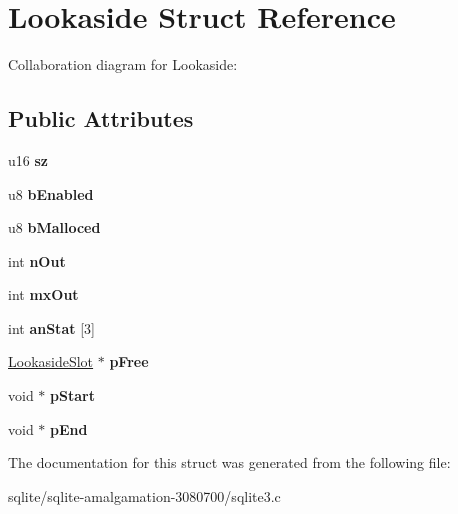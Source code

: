 \hypertarget{struct_lookaside}{\section{Lookaside Struct Reference}
\label{struct_lookaside}
}


Collaboration diagram for Lookaside\+:
\subsection*{Public Attributes}
\begin{DoxyCompactItemize}
\item 
\hypertarget{struct_lookaside_a2e8346b6cebbb64d9a6886a19ef843a1}{u16 {\bfseries sz}}\label{struct_lookaside_a2e8346b6cebbb64d9a6886a19ef843a1}

\item 
\hypertarget{struct_lookaside_adbe2c3486f893c30525e19388f35eb21}{u8 {\bfseries b\+Enabled}}\label{struct_lookaside_adbe2c3486f893c30525e19388f35eb21}

\item 
\hypertarget{struct_lookaside_a218f14cf9eb2c430867d286e9ac57ac5}{u8 {\bfseries b\+Malloced}}\label{struct_lookaside_a218f14cf9eb2c430867d286e9ac57ac5}

\item 
\hypertarget{struct_lookaside_a4cdd49fa554f877928d5bb31d55b32e9}{int {\bfseries n\+Out}}\label{struct_lookaside_a4cdd49fa554f877928d5bb31d55b32e9}

\item 
\hypertarget{struct_lookaside_a2ce364d95b55913df986999de442e4f9}{int {\bfseries mx\+Out}}\label{struct_lookaside_a2ce364d95b55913df986999de442e4f9}

\item 
\hypertarget{struct_lookaside_a7d875204cb05a327bb1652139faa4374}{int {\bfseries an\+Stat} \mbox{[}3\mbox{]}}\label{struct_lookaside_a7d875204cb05a327bb1652139faa4374}

\item 
\hypertarget{struct_lookaside_a318d2faa7f976f9d1b3c6e08bdc1d992}{\hyperlink{struct_lookaside_slot}{Lookaside\+Slot} $\ast$ {\bfseries p\+Free}}\label{struct_lookaside_a318d2faa7f976f9d1b3c6e08bdc1d992}

\item 
\hypertarget{struct_lookaside_a47073fcdffdc5a7a1464f0d09bfc17f9}{void $\ast$ {\bfseries p\+Start}}\label{struct_lookaside_a47073fcdffdc5a7a1464f0d09bfc17f9}

\item 
\hypertarget{struct_lookaside_ad3555c5558e104f2b82f62bf642cf831}{void $\ast$ {\bfseries p\+End}}\label{struct_lookaside_ad3555c5558e104f2b82f62bf642cf831}

\end{DoxyCompactItemize}


The documentation for this struct was generated from the following file\+:\begin{DoxyCompactItemize}
\item 
sqlite/sqlite-\/amalgamation-\/3080700/sqlite3.\+c\end{DoxyCompactItemize}
